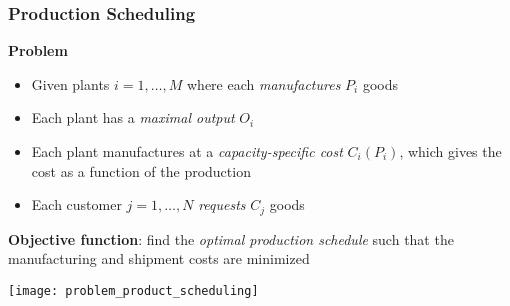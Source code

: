 \documentclass[%
  final,
  11pt, 
  show notes, %
  t, %
  fleqn, %
]{beamer}
\begin{document}

\begin{frame}[fragile]
  \frametitle{Production Scheduling}
\textbf{Problem}
\begin{itemize}
\item Given plants $i = 1, \ldots, M$ where each \emph{manufactures} $P_i$ goods
\item Each plant has a \emph{maximal output} $O_i$
\item Each plant manufactures at a \emph{capacity-specific cost} $C_i(P_i)$, which gives the cost as a function of the production
\item Each customer $j = 1, \ldots, N$ \emph{requests} $C_j$ goods
\end{itemize}

\vspace*{0.2cm}
\textbf{Objective function}: find the \emph{optimal production schedule} such that the manufacturing and shipment costs are minimized

\begin{center}
\texttt{[image: problem\_product\_scheduling]}
\end{center}
\end{frame}
\end{document}
